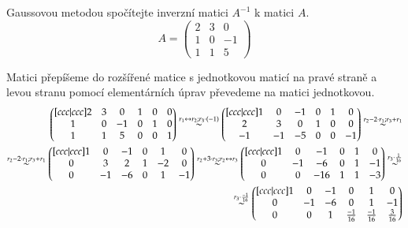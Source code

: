 \begin{example}
    Gaussovou metodou spočítejte inverzní matici $A^{-1}$ k matici $A$.
    \[A=
    \begin{pmatrix}
        2 & 3 & 0\\
        1 & 0 & -1\\
        1 & 1 & 5
    \end{pmatrix}
    \]

    Matici přepíšeme do rozšířené matice s jednotkovou maticí na pravé straně a levou
    stranu pomocí elementárních úprav převedeme na matici jednotkovou.
    \begin{align*}
        \begin{pmatrix}[ccc|ccc]
            2 & 3 & 0 & 1 & 0 & 0\\
            1 & 0 & -1 & 0 & 1 & 0\\
            1 & 1 & 5 & 0 & 0 & 1
        \end{pmatrix} \overset{r_1 \leftrightarrow r_2; r_3 \cdot (-1)} \sim
        \begin{pmatrix}[ccc|ccc]
            1 & 0 & -1 & 0 & 1 & 0\\
            2 & 3 & 0 & 1 & 0 & 0\\
            -1 & -1 & -5 & 0 & 0 & -1
        \end{pmatrix} \overset{r_2 - 2\cdot r_1; r_3 + r_1} \sim  \\ \overset{r_2 - 2\cdot r_1; r_3 + r_1} \sim
        \begin{pmatrix}[ccc|ccc]
            1 & 0 & -1 & 0 & 1 & 0\\
            0 & 3 & 2 & 1 & -2 & 0\\
            0 & -1 & -6 & 0 & 1 & -1
        \end{pmatrix} \overset{r_2 + 3\cdot r_3; r_2 \leftrightarrow r_3} \sim
        \begin{pmatrix}[ccc|ccc]
            1 & 0 & -1 & 0 & 1 & 0\\
            0 & -1 & -6 & 0 & 1 & -1\\
            0 & 0 & -16 & 1 & 1 & -3
        \end{pmatrix} \overset{r_3 \cdot \frac{1}{16}} \sim \\ \overset{r_3 \cdot \frac{-1}{16}} \sim
        \begin{pmatrix}[ccc|ccc]
            1 & 0 & -1 & 0 & 1 & 0\\
            0 & -1 & -6 & 0 & 1 & -1\\
            0 & 0 & 1 & \frac{-1}{16} & \frac{-1}{16} & \frac{3}{16}

\end{pmatrix}
\end{align*}
\end{example}
